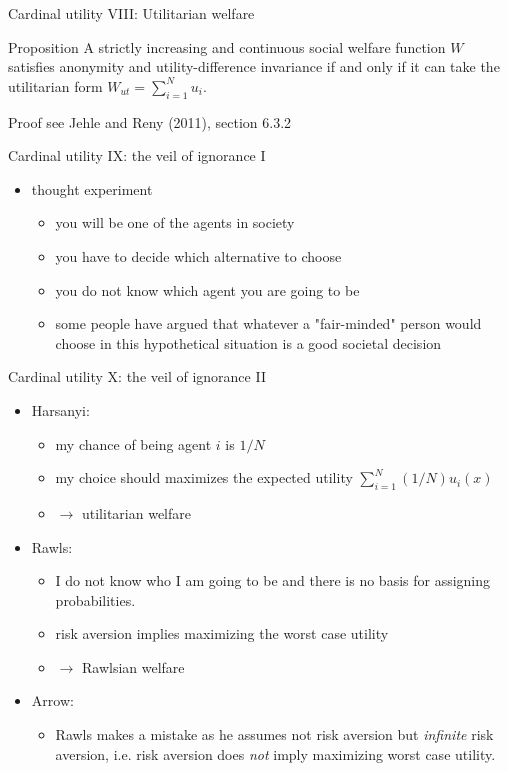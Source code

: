 \documentclass[bigger]{beamer}
\begin{document}
\begin{frame}[label={sec:org656e88b}]{Cardinal utility VIII: Utilitarian welfare}
\begin{block}{Proposition}
A strictly increasing and continuous social welfare function \(W\) satisfies anonymity and utility-difference invariance if and only if it can take the utilitarian form \(W_{ut}=\sum_{i=1}^N u_i\).
\end{block}
\begin{block}{Proof}
see Jehle and Reny (2011), section 6.3.2
\end{block}
\end{frame}
\begin{frame}[label={sec:org166b085}]{Cardinal utility IX: the veil of ignorance I}
\begin{itemize}
\item thought experiment  
\begin{itemize}
\item you will be one of the agents in society
\item you have to decide which alternative to choose
\item you do not know which agent you are going to be
\item some people have argued that whatever a "fair-minded" person would choose in this hypothetical situation is a good societal decision
\end{itemize}
\end{itemize}
\end{frame}
\begin{frame}[label={sec:org4b6c191}]{Cardinal utility X: the veil of ignorance II}
\begin{itemize}
\item Harsanyi:
\begin{itemize}
\item my chance of being agent \(i\) is \(1/N\)
\item my choice should maximizes the expected utility \(\sum_{i=1}^N (1/N) u_i(x)\)
\item \(\rightarrow\) utilitarian welfare
\end{itemize}
\item Rawls:
\begin{itemize}
\item I do not know who I am going to be and there is no basis for assigning probabilities.
\item risk aversion implies maximizing the worst case utility
\item \(\rightarrow\) Rawlsian welfare
\end{itemize}

\item Arrow:
\begin{itemize}
\item Rawls makes a mistake as he assumes not risk aversion but \emph{infinite} risk aversion, i.e. risk aversion does \emph{not} imply maximizing worst case utility.
\end{itemize}
\end{itemize}
\end{frame}
\end{document}
